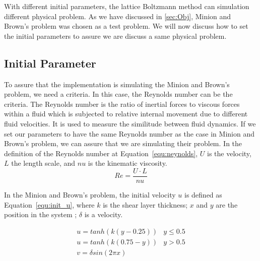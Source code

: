 With different initial parameters, the lattice Boltzmann method can simulation different physical problem. As we have discussed in \ref{sec:Obj}, Minion and Brown's problem\cite{minion1997performance} was chosen as a test problem. We will now discuss how to set the initial parameters to assure we are discuss a same physical problem.


\subsection{Initial Parameter}
To assure that the implementation is simulating the Minion and Brown's problem\cite{minion1997performance}, we need a criteria. In this case, the Reynolds number can be the criteria. The Reynolds number is the ratio of inertial forces to viscous forces within a fluid which is subjected to relative internal movement due to different fluid velocities\cite{munson2013fluid}. It is used to measure the similitude between fluid dynamics. If we set our parameters to have the same Reynolds number as the case in Minion and Brown's problem, we can assure that we are simulating their problem. In the definition of the Reynolds number at Equation~\ref{equ:neynolds}, $U$ is the velocity, $L$ the length scale, and $nu$ is the kinematic viscosity.
\begin{equation}
\label{equ:neynolds}
    Re = \frac{U \cdot L}{nu}
\end{equation}

In the Minion and Brown's problem, the initial velocity $u$ is defined as Equation~\ref{equ:init_u}, where $k$ is the shear layer thickness; $x$ and $y$ are the position in the system ; $\delta$ is a velocity. 

\begin{equation}
\label{equ:init_u}
    \begin{matrix}
u = tanh(k (y-0.25)) & y \leqslant 0.5 \\ 
u = tanh(k (0.75-y)) & y > 0.5  \\
v = \delta sin(2\pi x )
\end{matrix}
\end{equation}

